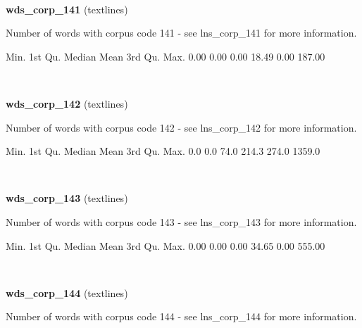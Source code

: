 \documentclass[]{article}
\newenvironment{Shaded}{\begin{snugshade}}{\end{snugshade}}
\newcommand{\FloatTok}[1]{\textcolor[rgb]{0.00,0.00,0.81}{{#1}}}
\newcommand{\NormalTok}[1]{{#1}}
\begin{document}
~

\vspace{1em}

\textbf{wds\_corp\_141} (textlines)

Number of words with corpus code 141 - see lns\_corp\_141 for more
information.

\begin{Shaded}
\begin{Highlighting}[]
   \NormalTok{Min. 1st Qu.  Median    Mean 3rd Qu.    Max. }
   \FloatTok{0.00}    \FloatTok{0.00}    \FloatTok{0.00}   \FloatTok{18.49}    \FloatTok{0.00}  \FloatTok{187.00} 
\end{Highlighting}
\end{Shaded}

~

\vspace{1em}

\textbf{wds\_corp\_142} (textlines)

Number of words with corpus code 142 - see lns\_corp\_142 for more
information.

\begin{Shaded}
\begin{Highlighting}[]
   \NormalTok{Min. 1st Qu.  Median    Mean 3rd Qu.    Max. }
    \FloatTok{0.0}     \FloatTok{0.0}    \FloatTok{74.0}   \FloatTok{214.3}   \FloatTok{274.0}  \FloatTok{1359.0} 
\end{Highlighting}
\end{Shaded}

~

\vspace{1em}

\textbf{wds\_corp\_143} (textlines)

Number of words with corpus code 143 - see lns\_corp\_143 for more
information.

\begin{Shaded}
\begin{Highlighting}[]
   \NormalTok{Min. 1st Qu.  Median    Mean 3rd Qu.    Max. }
   \FloatTok{0.00}    \FloatTok{0.00}    \FloatTok{0.00}   \FloatTok{34.65}    \FloatTok{0.00}  \FloatTok{555.00} 
\end{Highlighting}
\end{Shaded}

~

\vspace{1em}

\textbf{wds\_corp\_144} (textlines)

Number of words with corpus code 144 - see lns\_corp\_144 for more
information.
\end{document}
